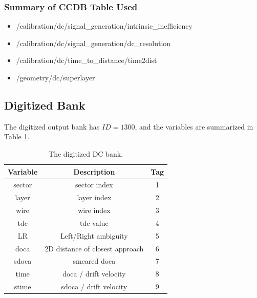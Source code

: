 \subsubsection{Summary of CCDB Table Used}
\begin{itemize}
	\item /calibration/dc/signal\_generation/intrinsic\_inefficiency
	\item /calibration/dc/signal\_generation/dc\_resolution
	\item /calibration/dc/time\_to\_distance/time2dist
	\item /geometry/dc/superlayer
\end{itemize}


\subsection{Digitized Bank}

The digitized output bank has $ID=1300$, and the variables are summarized in Table \ref{tab:dcBank}.

\begin{table}[h]
	\begin{center}
		\begin{tabular}{| c | c | c |}
			\hline \hline
			Variable         & Description  & Tag  \\
			\hline
               sector  &                                      sector index  &    1   \\
                layer  &                                       layer index  &    2   \\
                 wire  &                                        wire index  &    3   \\
                  tdc  &                                         tdc value  &    4   \\
                   LR  & Left/Right ambiguity                               &    5   \\
                 doca  & 2D distance of closest approach                    &    6   \\
                sdoca  &                                      smeared doca  &    7   \\
                 time  &              doca / drift velocity                 &    8   \\
                stime  &             sdoca / drift velocity                 &    9   \\
			\hline \hline
		\end{tabular}
	\end{center}
	\caption{The digitized DC bank.}\label{tab:dcBank}
\end{table}


